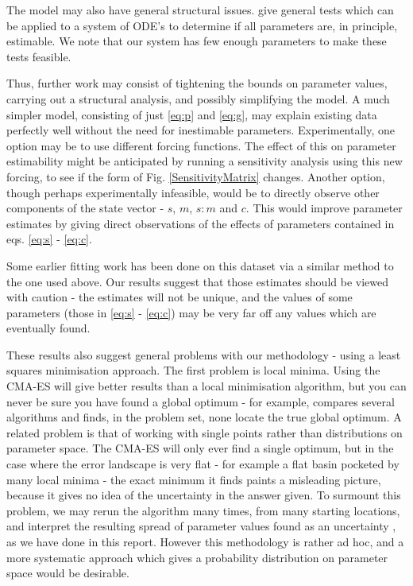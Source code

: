 \documentclass[10pt,journal]{./IEEE_latex_class/IEEEtran}
\begin{document}
 The model may also have general structural issues. \cite{Mclean2012, Grewal1976} give general tests which can be applied to a system of ODE's to determine if all parameters are, in principle, estimable. We note that our system has few enough parameters to make these tests feasible.
 
 Thus, further work may consist of tightening the bounds on parameter values, carrying out a structural analysis, and possibly simplifying the model. A much simpler model, consisting of  just \eqref{eq:p} and \eqref{eq:g}, may explain existing data perfectly well without the need for inestimable parameters. Experimentally, one option  may be to use different forcing functions. The effect of this on parameter estimability might be anticipated by running a sensitivity analysis using this new forcing, to see if the form of Fig. \ref{SensitivityMatrix} changes. Another option, though perhaps experimentally infeasible, would be to directly observe other components of the state vector - $s$, $m$, $s:m$ and $c$. This would improve parameter estimates by giving direct observations of the effects of parameters contained in eqs. \ref{eq:s} - \ref{eq:c}.

Some earlier fitting work has been done on this dataset via a similar method to the one used above. Our results suggest that those estimates should be viewed with caution - the estimates will not be unique, and the values of some parameters (those in \eqref{eq:s} - \eqref{eq:c}) may be very far off any values which are eventually found.

These results also suggest general problems with our methodology - using a least squares minimisation approach. The first problem is local minima. Using the CMA-ES will give better results than a local minimisation algorithm, but you can never be sure you have found a global optimum - for example, \cite{Algorithms2003} compares several algorithms and finds, in the problem set, none locate the true global optimum. A related problem is that of working with single points rather than distributions on parameter space. The CMA-ES will only ever find a single optimum, but in the case where the error landscape is very flat -  for example a flat basin pocketed by many local minima - the exact minimum it finds paints a misleading picture, because it gives no idea of the uncertainty in the answer given. To surmount this problem, we may rerun the algorithm many times, from many starting locations, and interpret the resulting spread of parameter values found as an uncertainty \cite{Hu2015}, as we have done in this report. However this methodology is rather ad hoc, and a more systematic approach which gives a probability distribution on parameter space would be desirable.
\end{document}
